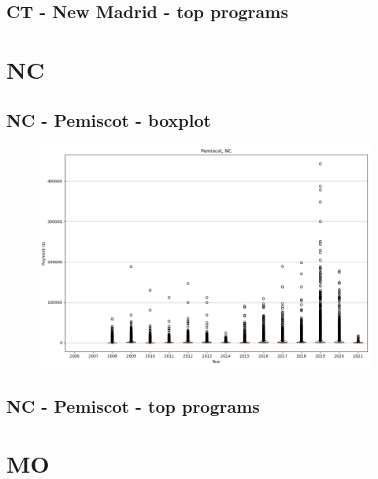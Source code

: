 \subsection*{CT - New Madrid - top programs}

\newpage
\section*{NC}
\subsection*{NC - Pemiscot - boxplot}
\begin{figure}[h]
\centering
\includegraphics[width=7in]{../output/boxplots/counties/Pemiscot-NC_boxplot.png}
\end{figure}


\subsection*{NC - Pemiscot - top programs}

\newpage
\section*{MO}

